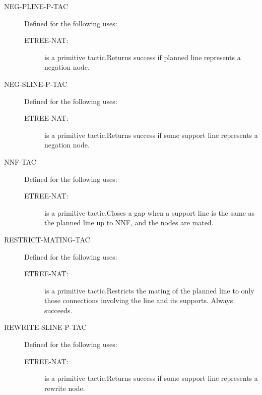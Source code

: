 \begin{description}
\begin{description}
\end{description}

\item[NEG-PLINE-P-TAC]  Defined for the following uses:
\begin{description}
\item[ETREE-NAT:]  is a primitive tactic.Returns success if planned line represents a negation node.

\end{description}

\item[NEG-SLINE-P-TAC]  Defined for the following uses:
\begin{description}
\item[ETREE-NAT:]  is a primitive tactic.Returns success if some support line represents a negation node.

\end{description}

\item[NNF-TAC]  Defined for the following uses:
\begin{description}
\item[ETREE-NAT:]  is a primitive tactic.Closes a gap when a support line is the same as the planned line up to NNF, and the nodes are mated.

\end{description}

\item[RESTRICT-MATING-TAC]  Defined for the following uses:
\begin{description}
\item[ETREE-NAT:]  is a primitive tactic.Restricts the mating of the planned line to only those connections
involving the line and its supports.  Always succeeds.

\end{description}

\item[REWRITE-SLINE-P-TAC]  Defined for the following uses:
\begin{description}
\item[ETREE-NAT:]  is a primitive tactic.Returns success if some support line represents a rewrite node.

\end{description}


\end{description}
